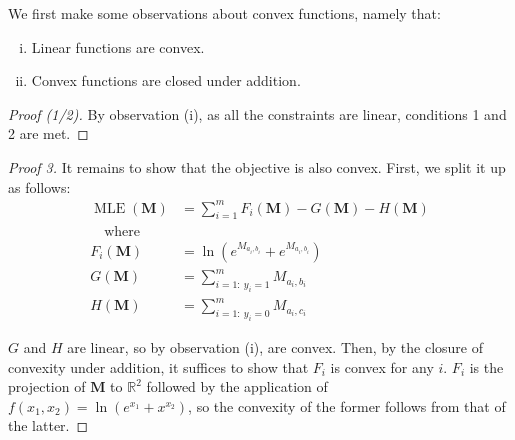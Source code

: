 We first make some observations about convex functions, namely that:
\begin{enumerate}[(i)]
  \item Linear functions are convex.
  \item Convex functions are closed under addition.
\end{enumerate}

\begin{proof}[Proof (1/2)]
  By observation (i), as all the constraints are linear, conditions 1 and 2 are met.\qedhere
\end{proof}

\begin{proof}[Proof 3]
  It remains to show that the objective is also convex. First, we split it up as follows:
  \begin{align*}
    \operatorname{MLE}(\mathbf{M}) & =
    \sum_{i=1}^mF_i(\mathbf{M}) - G(\mathbf{M}) - H(\mathbf{M})
    \\\quad\text{where}\quad &
    \\F_i(\mathbf{M}) & = \ln(e^{M_{a_i,b_i}}+e^{M_{a_i,b_i}})
    \\G(\mathbf{M}) & = \sum_{i=1:~y_i=1}^mM_{a_i,b_i}
    \\H(\mathbf{M}) & = \sum_{i=1:~y_i=0}^mM_{a_i,c_i}
  \end{align*}

  $G$ and $H$ are linear, so by observation (i), are convex. Then, by the closure of convexity under addition, it suffices to show that $F_i$ is convex for any $i$. $F_i$ is the projection of $\mathbf{M}$ to $\mathbb{R}^2$ followed by the application of $f(x_1,x_2)=\ln(e^{x_1}+x^{x_2})$, so the convexity of the former follows from that of the latter.


\end{proof}

